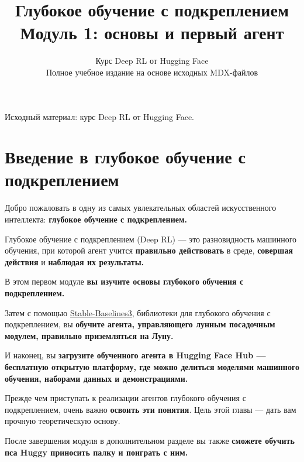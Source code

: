 \documentclass[11pt,a4paper]{article}
\title{\textbf{Глубокое обучение с подкреплением}\\[0.35em]\large Модуль 1: основы и первый агент}
\author{Курс Deep RL от Hugging Face\\\small Полное учебное издание на основе исходных MDX-файлов}
\date{}
\begin{document}
\selectfont
\maketitle
\vspace{-0.8em}
\begin{center}\small\color{secondary}Исходный материал: курс Deep RL от Hugging Face.\end{center}
\tableofcontents
\vspace{1em}
\clearpage
\section{Введение в глубокое обучение с подкреплением}\label{introduction-to-deep-reinforcement-learning}


Добро пожаловать в одну из самых увлекательных областей искусственного интеллекта: \textbf{глубокое обучение с подкреплением.}

Глубокое обучение с подкреплением (Deep RL) --- это разновидность машинного обучения, при которой агент учится \textbf{правильно действовать} в среде, \textbf{совершая действия} и \textbf{наблюдая их результаты.}

В этом первом модуле \textbf{вы изучите основы глубокого обучения с подкреплением.}

Затем с помощью \href{https://stable-baselines3.readthedocs.io/en/master/}{Stable-Baselines3}, библиотеки для глубокого обучения с подкреплением, вы \textbf{обучите агента, управляющего лунным посадочным модулем, правильно приземляться на Луну.}


И наконец, вы \textbf{загрузите обученного агента в Hugging Face Hub --- бесплатную открытую платформу, где можно делиться моделями машинного обучения, наборами данных и демонстрациями.}

Прежде чем приступать к реализации агентов глубокого обучения с подкреплением, очень важно \textbf{освоить эти понятия}. Цель этой главы --- дать вам прочную теоретическую основу.

После завершения модуля в дополнительном разделе вы также \textbf{сможете обучить пса Huggy приносить палку и поиграть с ним.}
\end{document}
